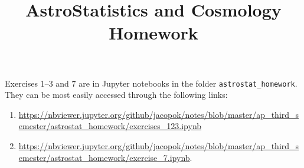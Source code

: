 \documentclass[11pt]{article}
\title{AstroStatistics and Cosmology Homework}
\begin{document}
\maketitle
\tableofcontents

Exercises 1--3 and 7 are in Jupyter notebooks in the folder \texttt{astrostat\_homework}.
They can be most easily accessed through the following links: 
\begin{enumerate}
    \item \url{https://nbviewer.jupyter.org/github/jacopok/notes/blob/master/ap_third_semester/astrostat_homework/exercises_123.ipynb}
    \item \url{https://nbviewer.jupyter.org/github/jacopok/notes/blob/master/ap_third_semester/astrostat_homework/exercise_7.ipynb}.
\end{enumerate}



\printbibliography
\end{document}
